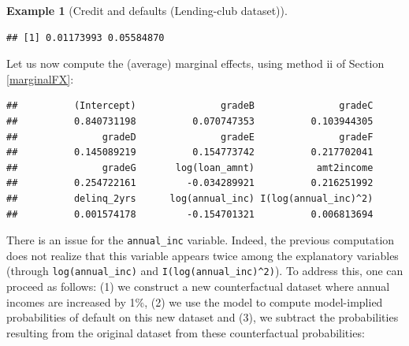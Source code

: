 \documentclass[
  12pt,
]{book}
\newenvironment{Shaded}{\begin{snugshade}}{\end{snugshade}}
\newcommand{\AttributeTok}[1]{\textcolor[rgb]{0.77,0.63,0.00}{#1}}
\newcommand{\CommentTok}[1]{\textcolor[rgb]{0.56,0.35,0.01}{\textit{#1}}}
\newcommand{\ConstantTok}[1]{\textcolor[rgb]{0.00,0.00,0.00}{#1}}
\newcommand{\FloatTok}[1]{\textcolor[rgb]{0.00,0.00,0.81}{#1}}
\newcommand{\FunctionTok}[1]{\textcolor[rgb]{0.00,0.00,0.00}{#1}}
\newcommand{\NormalTok}[1]{#1}
\newcommand{\OtherTok}[1]{\textcolor[rgb]{0.56,0.35,0.01}{#1}}
\newcommand{\SpecialCharTok}[1]{\textcolor[rgb]{0.00,0.00,0.00}{#1}}
\newcommand{\StringTok}[1]{\textcolor[rgb]{0.31,0.60,0.02}{#1}}
\theoremstyle{definition}
\theoremstyle{definition}
\newtheorem{example}{Example}[chapter]
\theoremstyle{definition}
\theoremstyle{definition}
\theoremstyle{remark}
\begin{document}
\begin{example}[Credit and defaults (Lending-club dataset)]
\begin{verbatim}
## [1] 0.01173993 0.05584870
\end{verbatim}

Let us now compute the (average) marginal effects, using method ii of Section \ref{marginalFX}:

\begin{Shaded}
\end{Shaded}

\begin{verbatim}
##          (Intercept)               gradeB               gradeC 
##          0.840731198          0.070747353          0.103944305 
##               gradeD               gradeE               gradeF 
##          0.145089219          0.154773742          0.217702041 
##               gradeG       log(loan_amnt)           amt2income 
##          0.254722161         -0.034289921          0.216251992 
##          delinq_2yrs      log(annual_inc) I(log(annual_inc)^2) 
##          0.001574178         -0.154701321          0.006813694
\end{verbatim}

There is an issue for the \texttt{annual\_inc} variable. Indeed, the previous computation does not realize that this variable appears twice among the explanatory variables (through \texttt{log(annual\_inc)} and \texttt{I(log(annual\_inc)\^{}2)}). To address this, one can proceed as follows: (1) we construct a new counterfactual dataset where annual incomes are increased by 1\%, (2) we use the model to compute model-implied probabilities of default on this new dataset and (3), we subtract the probabilities resulting from the original dataset from these counterfactual probabilities:

\begin{Shaded}
\end{Shaded}


\end{example}
\end{document}
